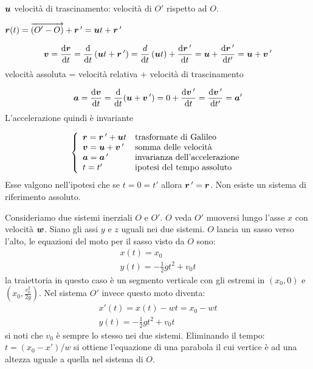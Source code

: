 $\boldsymbol{u}$ velocità di trascinamento: velocità di $O'$ rispetto ad $O$.
\begin{legge}
  $\boldsymbol{r}(t)=\overrightarrow{\left(O'-O\right)}+\boldsymbol{r}\,'=\boldsymbol{u}
    t+\boldsymbol{r}\,'$
\end{legge}
\begin{legge}
  \[\boldsymbol{v}=\frac{\mathrm{d}\boldsymbol{r}}{\mathrm{d} t}=\frac{\mathrm{d}}{\mathrm{d} t}\left(\boldsymbol{u}
    t+\boldsymbol{r}\,'\right)=\frac{d}{\mathrm{d} t}\left(\boldsymbol{u}
    t\right)+\frac{\mathrm{d}\boldsymbol{r}\,'}{\mathrm{d} t}=\boldsymbol{u}+\frac{\mathrm{d}\boldsymbol{r}\,'}{\mathrm{d}
      t'}=\boldsymbol{u}+\boldsymbol{v}\,'\]
  velocità assoluta = velocità relativa + velocità di trascinamento
\end{legge}
\begin{legge}
  \[\boldsymbol{a}=\frac{\mathrm{d} \boldsymbol{v}}{\mathrm{d} t}=\frac{\mathrm{d}}{\mathrm{d} t}(\boldsymbol{u}+\boldsymbol{v}\,')=0+\frac{\mathrm{d} \boldsymbol{v}\,'}{\mathrm{d} t}=\frac{\mathrm{d} \boldsymbol{v}\,'}{\mathrm{d}
      t'}=\boldsymbol{a}'\]
  L'accelerazione quindi è invariante
\end{legge}
\[\left\{\begin{array}{ll}
    \boldsymbol{r}=\boldsymbol{r}\,'+\boldsymbol{u} t & \text{trasformate di Galileo}        \\
    \boldsymbol{v}=\boldsymbol{u}+\boldsymbol{v}\,'   & \text{somma delle velocità}          \\
    \boldsymbol{a}=\boldsymbol{a}\,'         & \text{invarianza dell'accelerazione} \\
    t=t'                   & \text{ipotesi del tempo assoluto}    \\
  \end{array}\right.\]
Esse valgono nell'ipotesi che se $t=0=t'$ allora $\boldsymbol{r}\,'=\boldsymbol{r}$.
Non esiste un sistema di riferimento assoluto.
\begin{Es}
  Consideriamo due sistemi inerziali $O$ e $O'$. $O$ veda $O'$ muoversi lungo l'asse $x$ con velocità $\boldsymbol{w}$. Siano gli assi $y$ e $z$ uguali nei due sistemi. $O$ lancia un sasso verso l'alto, le equazioni del moto per il sasso visto da $O$ sono:
  \begin{gather*}
    x(t) = x_0\\
    y(t) = -\frac{1}{2}gt^2 + v_0 t
  \end{gather*}
  la traiettoria in questo caso è un segmento verticale con gli estremi in $(x_0,0)$ e $(x_0,\frac{v_0^2}{2g})$. Nel sistema $O'$ invece questo moto diventa:
  \begin{gather*}
    x'(t) = x(t) - w t = x_0 - wt\\
    y(t) = -\frac{1}{2}gt^2 + v_0 t
  \end{gather*}
  si noti che $v_0$ è sempre lo stesso nei due sistemi. Eliminando il tempo: $t = (x_0-x') /w$ si ottiene l'equazione di una parabola il cui vertice è ad una altezza uguale a quella nel sistema di $O$.
\end{Es}

